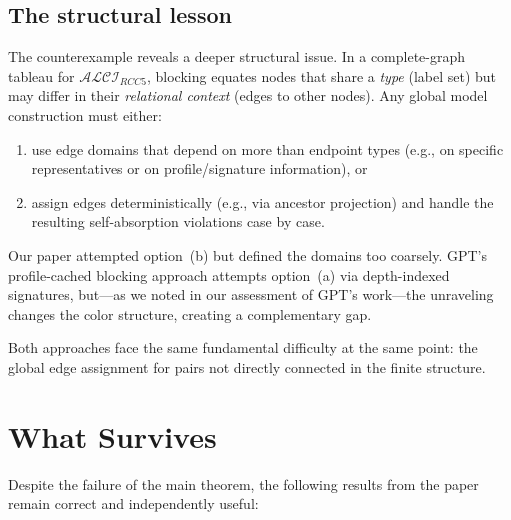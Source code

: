 \documentclass[a4paper,11pt]{article}
\theoremstyle{definition}
\newcommand{\ALCIRCC}[1]{\ensuremath{\mathcal{ALCI}_{\mathit{RCC#1}}}}
\begin{document}
\subsection{The structural lesson}

The counterexample reveals a deeper structural issue.  In a
complete-graph tableau for $\ALCIRCC{5}$, blocking equates nodes that
share a \emph{type} (label set) but may differ in their
\emph{relational context} (edges to other nodes).  Any global model
construction must either:
\begin{enumerate}[nosep,label=(\alph*)]
  \item use edge domains that depend on more than endpoint types
    (e.g., on specific representatives or on profile/signature
    information), or
  \item assign edges deterministically (e.g., via ancestor projection)
    and handle the resulting self-absorption violations case by case.
\end{enumerate}

Our paper attempted option~(b) but defined the domains too coarsely.
GPT's profile-cached blocking approach attempts option~(a) via
depth-indexed signatures, but---as we noted in our assessment of
GPT's work---the unraveling changes the color structure, creating a
complementary gap.

Both approaches face the same fundamental difficulty at the same
point: the global edge assignment for pairs not directly connected in
the finite structure.


\section{What Survives}

Despite the failure of the main theorem, the following results from
the paper remain correct and independently useful:
\end{document}
